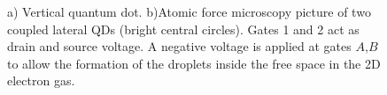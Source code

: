 \begin{figure}[hbt]
    \centering
    \hspace{6mm}
    \caption{ a) Vertical quantum dot.  b)Atomic force microscopy
    picture of two coupled lateral QDs (bright central circles). Gates 1 and 2 act as drain and source voltage. A negative
    voltage is applied at gates $A$,$B$ to allow the formation of the droplets inside the free space in the 2D electron gas. \protect{} }
\end{figure}

